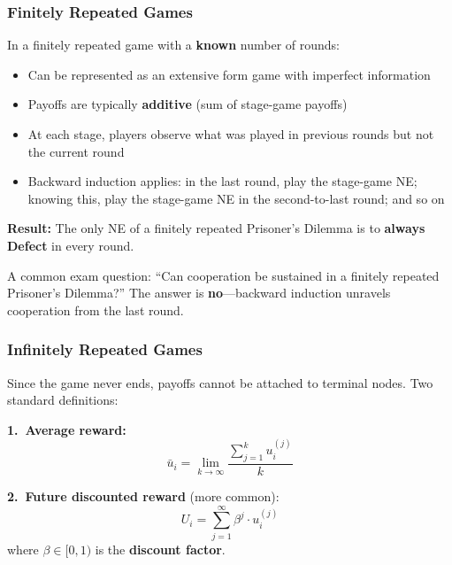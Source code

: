 \separator

\subsubsection{Finitely Repeated Games}

\begin{thmbox}
In a finitely repeated game with a \textbf{known} number of rounds:
\begin{itemize}
  \item Can be represented as an extensive form game with imperfect information
  \item Payoffs are typically \textbf{additive} (sum of stage-game payoffs)
  \item At each stage, players observe what was played in previous rounds but not the current round
  \item Backward induction applies: in the last round, play the stage-game NE; knowing this, play the stage-game NE in the second-to-last round; and so on
\end{itemize}

\textbf{Result:} The only NE of a finitely repeated Prisoner's Dilemma is to \textbf{always Defect} in every round.
\end{thmbox}

\begin{tipbox}
A common exam question: ``Can cooperation be sustained in a finitely repeated Prisoner's Dilemma?'' The answer is \textbf{no}---backward induction unravels cooperation from the last round.
\end{tipbox}

\separator

\subsubsection{Infinitely Repeated Games}

\begin{defbox}
Since the game never ends, payoffs cannot be attached to terminal nodes. Two standard definitions:

\textbf{1.\ Average reward:}
\[
\bar{u}_i = \lim_{k \to \infty} \frac{\sum_{j=1}^{k} u_i^{(j)}}{k}
\]

\textbf{2.\ Future discounted reward} (more common):
\[
U_i = \sum_{j=1}^{\infty} \beta^{j} \cdot u_i^{(j)}
\]
where $\beta \in [0,1)$ is the \textbf{discount factor}.
\end{defbox}


